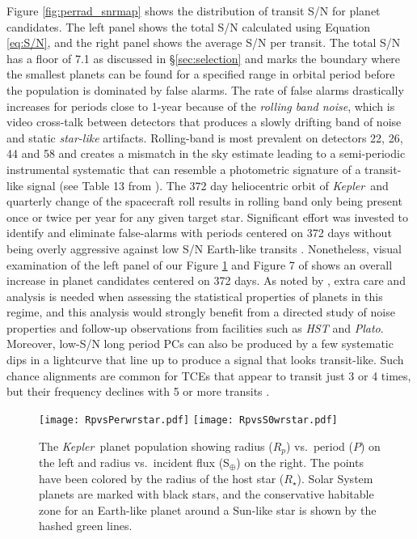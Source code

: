 \documentclass{aastex62}
\newcommand{\ik}{{\it Kepler~}}
\begin{document}
Figure \ref{fig:perrad_snrmap} shows the distribution of transit S/N for planet candidates.  The left panel shows the total S/N calculated using Equation \ref{eq:S/N}, and the right panel shows the average S/N per transit.  The total S/N has a floor of 7.1 as discussed in \S\ref{sec:selection} and marks the boundary where the smallest planets can be found for a specified range in orbital period before the population is dominated by false alarms.  The rate of false alarms drastically increases for periods close to 1-year because of the {\it rolling band noise}, which is video cross-talk between detectors that produces a slowly drifting band of noise {and static {\it star-like} artifacts}. Rolling-band is most prevalent on detectors 22, 26, 44 and 58 and creates a mismatch in the sky estimate leading to a semi-periodic instrumental systematic that can resemble a photometric signature of a transit-like signal (see Table 13 from \citealt{vanCleve:2016}).  The 372 day heliocentric orbit of \ik and quarterly change of the spacecraft roll results in rolling band only being present once or twice per year for any given target star.  Significant effort was invested to identify and eliminate false-alarms with periods centered on 372 days without being overly aggressive against low S/N Earth-like transits \citep{Thompson:2018}. Nonetheless, visual examination of the left panel of our Figure \ref{fig:rpvsperwrstar} and Figure {7} of \citet{Thompson:2018} shows an overall increase in planet candidates centered on 372 days.  As noted by \cite{Burke:2019}, extra care and analysis is needed when assessing the statistical properties of planets in this regime, and this analysis would strongly benefit from a directed study of noise properties and follow-up observations from facilities such as {\it HST} and {\it Plato}. {Moreover, low-S/N long period PCs can also be produced by a few systematic dips in a lightcurve that line up to produce a signal that looks transit-like. Such chance alignments are common for TCEs that appear to transit just 3 or 4 times, but their frequency declines with 5 or more transits \citep{Mullally:2018}.} 


\begin{figure}[!hbt]
\texttt{[image: RpvsPerwrstar.pdf]}
\texttt{[image: RpvsS0wrstar.pdf]}
\caption{The \ik planet population showing radius ($R_p$) vs.~period ($P$) on the left and radius vs.~incident flux (S$_{\oplus}$) on the right.  The points have been colored by the radius of the host star ($R_\star$).  Solar System planets are marked with black stars, and the conservative habitable zone for an Earth-like planet around a Sun-like star \citep{Kopparapu:2014} is shown by the hashed green lines. 
}\label{fig:rpvsperwrstar}
\end{figure}
\end{document}

